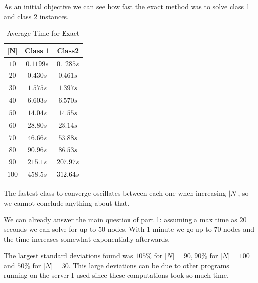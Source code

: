 \documentclass[a4paper,12pt]{article}
\begin{document}
		
		As an initial objective we can see how fast the exact method was to solve class 1 and class 2 instances.
		\begin{table}[H]
			\centering
			\begin{tabular}{c|c|c}
				$\mathbf{|N|}$  & \textbf{Class 1} 	& \textbf{Class2}  \\ \hline
				$ 10  $			& $ 0.1199 s $ 		& $ 0.1285 s $ 		\\ \hline
				$ 20  $			& $ 0.430 s $ 		& $ 0.461 s $		\\ \hline
				$ 30  $			& $ 1.575 s $	 	& $ 1.397 s $ 		\\ \hline
				$ 40  $			& $ 6.603 s $ 		& $ 6.570 s $ 		\\ \hline
				$ 50  $			& $ 14.04 s $ 		& $ 14.55 s $ 		\\ \hline
				$ 60 $			& $ 28.80 s $ 		& $ 28.14 s $ 		\\ \hline
				$ 70 $			& $ 46.66s $	 	& $ 53.88 s $ 		\\ \hline
				$ 80 $			& $ 90.96 s $ 		& $ 86.53 s $ 		\\ \hline
				$ 90 $			& $ 215.1 s $	 	& $ 207.97 s $ 		\\ \hline
				$ 100 $			& $ 458.5 s $ 		& $ 312.64 s $ 		\\ 
			\end{tabular}
			\caption{Average Time for Exact}
			\label{table:times}
		\end{table}
		The fastest class to converge oscillates between each one when increasing $ |N| $, so we cannot conclude anything about that.		
				
		We can already answer the main question of part 1: assuming a max time as $ 20 $ seconds we can solve for up to $ 50 $ nodes.
		With 1 minute we go up to $ 70 $ nodes and the time increases somewhat exponentially afterwards.
		
		The largest standard deviations found was $ 105\% $ for $ |N| = 90$, $ 90\% $ for $ |N| = 100$ and $ 50\% $ for $ |N| = 30$.
		This large deviations can be due to other programs running on the server I used since these computations took so much time.
		
\end{document}
